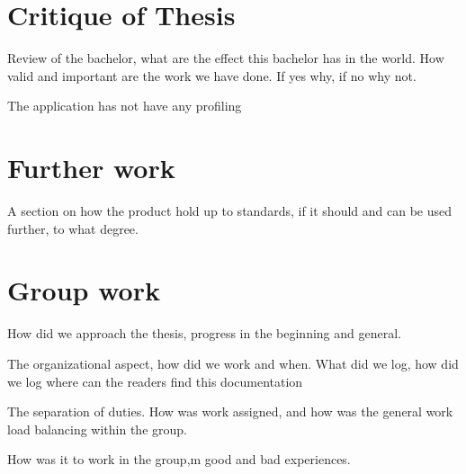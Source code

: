 \section{Critique of Thesis}
Review of the bachelor, what are the effect this bachelor has in the world. How valid and important are the work we have done. If yes why, if no why not.

The application has not have any profiling 
% 



\section{Further work}
A section on how the product hold up to standards, if it should and can be used further, to what degree.
% 





\section{Group work}
How did we approach the thesis, progress in the beginning and general.

The organizational aspect, how did we work and when. What did we log, how did we log where can the readers find this documentation

The separation of duties. How was work assigned, and how was the general work load balancing within the group. 

How was it to work in the group,m good and bad experiences.


% 